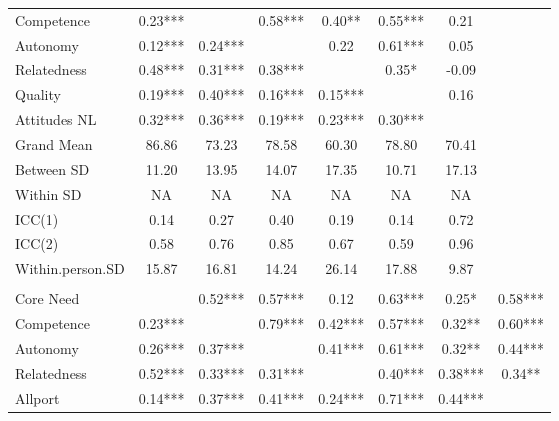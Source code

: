\begin{table}
\begin{minipage}[t][\textheight][t]{\textwidth}
{\begin{tabular}[t]{lccccccc}
\hspace{1em}Competence & 0.23*** &  & 0.58*** & 0.40** & 0.55*** & 0.21 & \\
\hspace{1em}Autonomy & 0.12*** & 0.24*** &  & 0.22 & 0.61*** & 0.05 & \\
\hspace{1em}Relatedness & 0.48*** & 0.31*** & 0.38*** &  & 0.35* & -0.09 & \\
\hspace{1em}Quality & 0.19*** & 0.40*** & 0.16*** & 0.15*** &  & 0.16 & \\
\hspace{1em}Attitudes NL & 0.32*** & 0.36*** & 0.19*** & 0.23*** & 0.30*** &  & \\
\addlinespace
\hspace{1em}Grand Mean & 86.86 & 73.23 & 78.58 & 60.30 & 78.80 & 70.41 & \\
\hspace{1em}Between SD & 11.20 & 13.95 & 14.07 & 17.35 & 10.71 & 17.13 & \\
\hspace{1em}Within SD & NA & NA & NA & NA & NA & NA & \\
\hspace{1em}ICC(1) & 0.14 & 0.27 & 0.40 & 0.19 & 0.14 & 0.72 & \\
\hspace{1em}ICC(2) & 0.58 & 0.76 & 0.85 & 0.67 & 0.59 & 0.96 & \\
\hspace{1em}Within.person.SD & 15.87 & 16.81 & 14.24 & 26.14 & 17.88 & 9.87 & \\
\addlinespace[0.3em]
\multicolumn{8}{l}{\textbf{Study 3}}\\
\hspace{1em}Core Need &  & 0.52*** & 0.57*** & 0.12 & 0.63*** & 0.25* & 0.58***\\
\hspace{1em}Competence & 0.23*** &  & 0.79*** & 0.42*** & 0.57*** & 0.32** & 0.60***\\
\hspace{1em}Autonomy & 0.26*** & 0.37*** &  & 0.41*** & 0.61*** & 0.32** & 0.44***\\
\hspace{1em}Relatedness & 0.52*** & 0.33*** & 0.31*** &  & 0.40*** & 0.38*** & 0.34**\\
\hspace{1em}Allport & 0.14*** & 0.37*** & 0.41*** & 0.24*** & 0.71*** & 0.44*** & \\

\end{tabular}}
\end{minipage}
\end{table}
